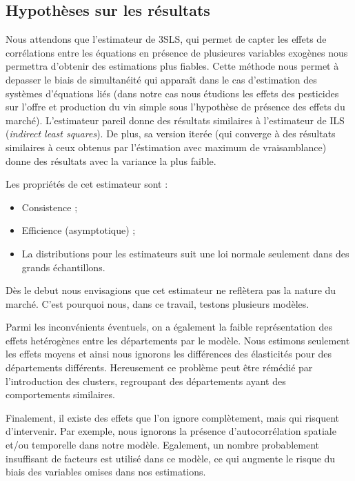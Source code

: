 \documentclass[11pt,]{article}
\providecommand{\tightlist}{%
  \setlength{\itemsep}{0pt}\setlength{\parskip}{0pt}}
\begin{document}
\hypertarget{hypotheses-sur-les-resultats}{%
\subsection{Hypothèses sur les
résultats}\label{hypotheses-sur-les-resultats}}

Nous attendons que l'estimateur de 3SLS, qui permet de capter les effets
de corrélations entre les équations en présence de plusieures variables
exogènes nous permettra d'obtenir des estimations plus fiables. Cette
méthode nous permet à depasser le biais de simultanéité qui apparaît
dans le cas d'estimation des systèmes d'équations liés (dans notre cas
nous étudions les effets des pesticides sur l'offre et production du vin
simple sous l'hypothèse de présence des effets du marché). L'estimateur
pareil donne des résultats similaires à l'estimateur de ILS
(\emph{indirect least squares}). De plus, sa version iterée (qui
converge à des résultats similaires à ceux obtenus par l'éstimation avec
maximum de vraisamblance) donne des résultats avec la variance la plus
faible.

Les propriétés de cet estimateur sont :

\begin{itemize}
\tightlist
\item
  Consistence ;
\item
  Efficience (asymptotique) ;
\item
  La distributions pour les estimateurs suit une loi normale seulement
  dans des grands échantillons.
\end{itemize}

Dès le debut nous envisagions que cet estimateur ne reflètera pas la
nature du marché. C'est pourquoi nous, dans ce travail, testons
plusieurs modèles.

Parmi les inconvénients éventuels, on a également la faible
représentation des effets hetérogènes entre les départements par le
modèle. Nous estimons seulement les effets moyens et ainsi nous ignorons
les différences des élasticités pour des départements différents.
Hereusement ce problème peut être rémédié par l'introduction des
clusters, regroupant des départements ayant des comportements
similaires.

Finalement, il existe des effets que l'on ignore complètement, mais qui
risquent d'intervenir. Par exemple, nous ignorons la présence
d'autocorrélation spatiale et/ou temporelle dans notre modèle.
Egalement, un nombre probablement insuffisant de facteurs est utilisé
dans ce modèle, ce qui augmente le risque du biais des variables omises
dans nos estimations.
\end{document}
